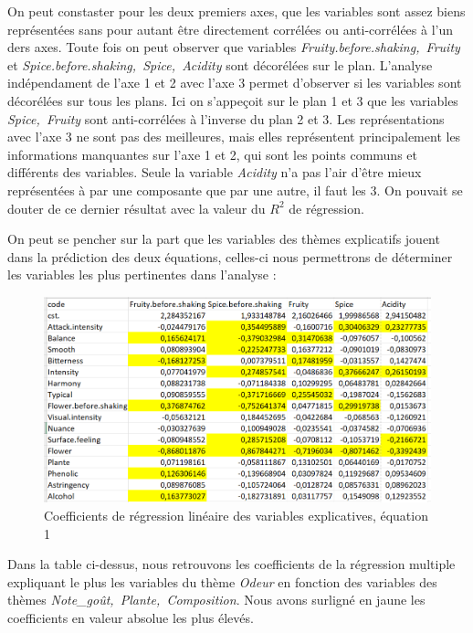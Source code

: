 \documentclass[a4paper,french,10pt]{article}
\begin{document}
\newpage
On peut constaster pour les deux premiers axes, que les variables sont assez biens représentées sans pour autant être directement corrélées ou anti-corrélées à l'un ders axes. Toute fois on peut observer que variables \textit{Fruity.before.shaking,~Fruity} et \textit{Spice.before.shaking,~Spice,~Acidity} sont décorélées sur le plan. L'analyse indépendament de l'axe 1 et 2 avec l'axe 3 permet d'observer si les variables sont décorélées sur tous les plans. Ici on s'appeçoit sur le plan 1 et 3 que les variables \textit{Spice,~Fruity} sont anti-corrélées à l'inverse du plan 2 et 3. Les représentations avec l'axe 3 ne sont pas des meilleures, mais elles représentent principalement les informations manquantes sur l'axe 1 et 2, qui sont les points communs et différents des variables. Seule la variable \textit{Acidity} n'a pas l'air d'être mieux représentées à par une composante que par une autre, il faut les 3. On pouvait se douter de ce dernier résultat avec la valeur du $R^2$ de régression.\newline

On peut se pencher sur la part que les variables des thèmes explicatifs jouent dans la prédiction des deux équations, celles-ci nous permettrons de déterminer les variables les plus pertinentes dans l'analyse : 

\begin{figure}[htp] 
	\centering
	\includegraphics[scale=0.45]{images/Coeff_var_Eq1.png}
	\caption{Coefficients de régression linéaire des variables explicatives, équation 1}
\end{figure}

Dans la table ci-dessus, nous retrouvons les coefficients de la régression multiple expliquant le plus les variables du thème \textit{Odeur} en fonction des variables des thèmes \textit{Note\_goût,~Plante,~Composition}.
Nous avons surligné en jaune les coefficients en valeur absolue les plus élevés.
\end{document}
